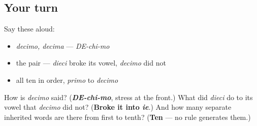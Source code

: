 \subsection*{Your turn}
Say these aloud:

\begin{itemize}
\raggedright
  \item \emph{decimo, decima} — \emph{DE-chi-mo}
  \item the pair — \emph{dieci} broke its vowel, \emph{decimo} did not
  \item all ten in order, \emph{primo} to \emph{decimo}
\end{itemize}

\begin{tcolorbox}[breakable,colback=teal!4,colframe=teal!35!black,title={Before you move on}]
How is \emph{decimo} said? (\emph{\textbf{DE-chi-mo}}, stress at the front.) What did \emph{dieci} do to its vowel that \emph{decimo} did not? (\textbf{Broke it into \emph{ie}}.) And how many separate inherited words are there from first to tenth? (\textbf{Ten} — no rule generates them.)
\end{tcolorbox}
